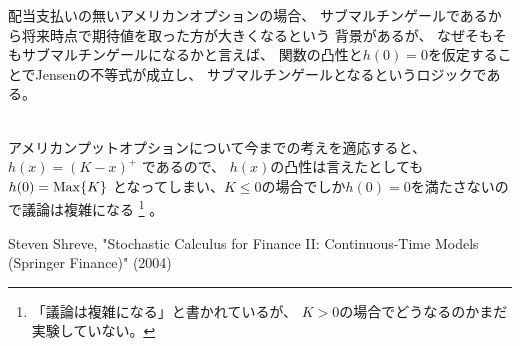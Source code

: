 \documentclass[uplatex,a4j,12pt,dvipdfmx]{jsarticle}
\begin{document}
配当支払いの無いアメリカンオプションの場合、
サブマルチンゲールであるから将来時点で期待値を取った方が大きくなるという
背景があるが、
なぜそもそもサブマルチンゲールになるかと言えば、
関数の凸性と$h(0)=0$を仮定することでJensenの不等式が成立し、
サブマルチンゲールとなるというロジックである。


\ \\

アメリカンプットオプションについて今までの考えを適応すると、
$h(x)=(K-x)^{+}$
であるので、
$h(x)$の凸性は言えたとしても$h(0)={\rm Max} \{ K \} $
となってしまい、$K \leq 0$の場合でしか$h(0)=0$を満たさないので議論は複雑になる
\footnote{「議論は複雑になる」と書かれているが、
	$K > 0$の場合でどうなるのかまだ実験していない。}
。


\begin{thebibliography}{9}
	 Steven Shreve, "Stochastic Calculus for Finance II: Continuous-Time Models (Springer Finance)" (2004)

\end{thebibliography}
\end{document}
